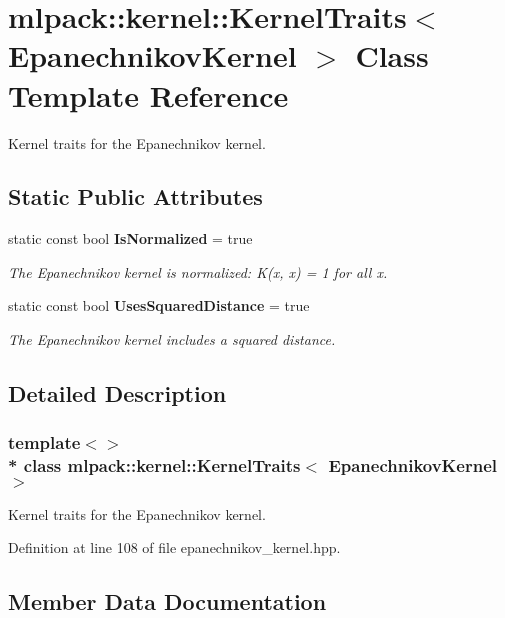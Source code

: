 \section{mlpack\+:\+:kernel\+:\+:Kernel\+Traits$<$ Epanechnikov\+Kernel $>$ Class Template Reference}
\label{classmlpack_1_1kernel_1_1KernelTraits_3_01EpanechnikovKernel_01_4}


Kernel traits for the Epanechnikov kernel.  


\subsection*{Static Public Attributes}
\begin{DoxyCompactItemize}
\item 
static const bool {\bf Is\+Normalized} = true
\begin{DoxyCompactList}\small\item\em The Epanechnikov kernel is normalized\+: K(x, x) = 1 for all x. \end{DoxyCompactList}\item 
static const bool {\bf Uses\+Squared\+Distance} = true
\begin{DoxyCompactList}\small\item\em The Epanechnikov kernel includes a squared distance. \end{DoxyCompactList}\end{DoxyCompactItemize}


\subsection{Detailed Description}
\subsubsection*{template$<$$>$\\*
class mlpack\+::kernel\+::\+Kernel\+Traits$<$ Epanechnikov\+Kernel $>$}

Kernel traits for the Epanechnikov kernel. 

Definition at line 108 of file epanechnikov\+\_\+kernel.\+hpp.



\subsection{Member Data Documentation}
